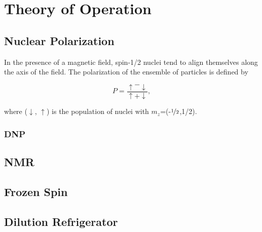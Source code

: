 \chapter{Theory of Operation} 
\label{theory}  
\section{Nuclear Polarization}
In the presence of a magnetic field, spin-1/2 nuclei tend to align themselves along the axis of the field.  The polarization of the ensemble of particles is defined by 

$$P=\frac{\uparrow-\downarrow}{\uparrow+\downarrow},$$

where ($\downarrow$, $\uparrow$) is the population of nuclei with $m_z$=(-$\nicefrac{1}{2}$,1/2).
 \subsection{DNP}

\section{NMR}

\section{Frozen Spin} 
 
\section{Dilution Refrigerator} 

